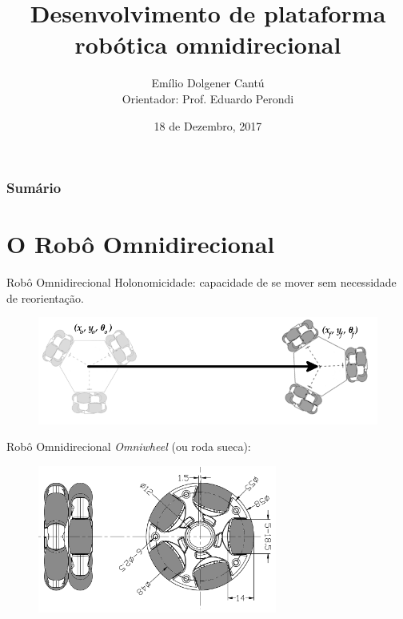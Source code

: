 \documentclass{beamer}
\title{Desenvolvimento de plataforma robótica omnidirecional}
\date{18 de Dezembro, 2017}
\author{Emílio Dolgener Cantú \\ Orientador: Prof. Eduardo Perondi}
\institute{Universidade Federal do Rio Grande do Sul}
\begin{document}
\maketitle
\begin{frame}
  \frametitle{Sumário}
  \tableofcontents
\end{frame}
\section{O Robô Omnidirecional}
\begin{frame}{Robô Omnidirecional}
  Holonomicidade: capacidade de se mover sem necessidade de reorientação.
  \begin{figure}[h]
    \centering
    \includegraphics[width = \textwidth]{imagens/hibrida}
  \end{figure}
\end{frame}

\begin{frame}{Robô Omnidirecional}
  \emph{Omniwheel} (ou roda sueca):
  \begin{figure}[h]
    \centering
    \includegraphics[width = 0.7\textwidth]{imagens/omniwheel}
  \end{figure}
\end{frame}
\end{document}
